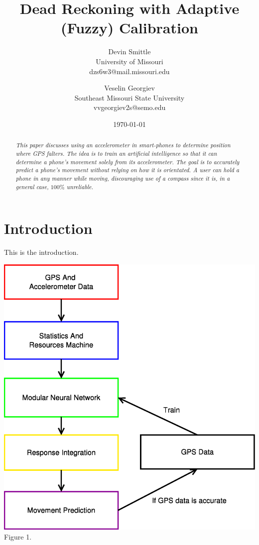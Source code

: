 \documentclass[twocolumn]{article}
\begin{document}
\title{Dead Reckoning with Adaptive (Fuzzy) Calibration}
\author{ Devin Smittle \\ University of Missouri \\
  dzs6w3@mail.missouri.edu \and Veselin Georgiev \\ Southeast Missouri
State University \\ vvgeorgiev2s@semo.edu} \date{\today}
\maketitle

\begin{abstract}
  \emph{This paper discusses using an accelerometer in smart-phones to
  determine position where GPS falters. The idea is to train an
  artificial intelligence so that it can determine a phone's movement
  solely from its accelerometer. The goal is to accurately predict a
  phone's movement without relying on how it is orientated. A user can
  hold a phone in any manner while moving, discouraging use of a
  compass since it is, in a general case, $100\%$ unreliable.}
\end{abstract}

\section{Introduction}

This is the introduction.

\begin{center}

\includegraphics[width=0.9\columnwidth,keepaspectratio]{../figures/process_diagram/process}
\\
Figure 1.
  
\end{center}
\end{document}
